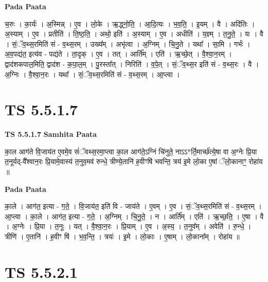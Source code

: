 \documentclass[17pt]{extarticle}
\begin{document}
\textbf{Pada Paata} \newline

च॒रुः । का॒र्यः॑ । अ॒स्मिन्न् । ए॒व । लो॒के । ऋ॒द्ध्नो॒ति॒ । आ॒दि॒त्यः । भ॒व॒ति॒ । इ॒यम् । वै । अदि॑तिः । अ॒स्याम् । ए॒व । प्रतीति॑ । ति॒ष्ठ॒ति॒ । अथो॒ इति॑ । अ॒स्याम् । ए॒व । अधीति॑ । य॒ज्ञ्म् । त॒नु॒ते॒ । यः । वै । सं॒ॅव॒थ्स॒रमिति॑ सं - व॒थ्स॒रम् । उख्य᳚म् । अभृ॑त्वा । अ॒ग्निम् । चि॒नु॒ते । यथा᳚ । सा॒मि । गर्भः॑ । अ॒व॒पद्य॑त॒ इत्य॑व - पद्य॑ते । ता॒दृक् । ए॒व । तत् । आर्ति᳚म् । एति॑ । ऋ॒च्छे॒त् । वै॒श्वा॒न॒रम् । द्वाद॑शकपाल॒मिति॒ द्वाद॑श - क॒पा॒ल॒म् । पु॒रस्ता᳚त् । निरिति॑ । व॒पे॒त् । सं॒ॅव॒थ्स॒र इति॑ सं - व॒थ्स॒रः । वै । अ॒ग्निः । वै॒श्वा॒न॒रः । यथा᳚ । सं॒ॅव॒थ्स॒रमिति॑ सं - व॒थ्स॒रम् । आ॒प्त्वा ।  \newline





\section{ TS 5.5.1.7 }

\textbf{TS 5.5.1.7 } \newline
\textbf{Samhita Paata} \newline

का॒ल आग॑ते वि॒जाय॑त ए॒वमे॒व सं॑ॅवथ्स॒रमा॒प्त्वा का॒ल आग॑ते॒ऽग्निं चि॑नुते॒ नाऽऽ*र्ति॒मार्च्छ॑त्ये॒षा वा अ॒ग्नेः प्रि॒या त॒नूर्यद्-वै᳚श्वान॒रः प्रि॒यामे॒वास्य॑ त॒नुव॒मव॑ रुन्धे॒ त्रीण्ये॒तानि॑ ह॒वीꣳषि॑ भवन्ति॒ त्रय॑ इ॒मे लो॒का ए॒षां ॅलो॒कानाꣳ॒॒ रोहा॑य ॥ \newline

\textbf{Pada Paata} \newline

का॒ले । आग॑त॒ इत्या - ग॒ते॒ । वि॒जाय॑त॒ इति॑ वि - जाय॑ते । ए॒वम् । ए॒व । सं॒ॅव॒थ्स॒रमिति॑ सं - व॒थ्स॒रम् । आ॒प्त्वा । का॒ले । आग॑त॒ इत्या - ग॒ते॒ । अ॒ग्निम् । चि॒नु॒ते॒ । न । आर्ति᳚म् । एति॑ । ऋ॒च्छ॒ति॒ । ए॒षा । वै । अ॒ग्नेः । प्रि॒या । त॒नूः । यत् । वै॒श्वा॒न॒रः । प्रि॒याम् । ए॒व । अ॒स्य॒ । त॒नुव᳚म् । अवेति॑ । रु॒न्धे॒ । त्रीणि॑ । ए॒तानि॑ । ह॒वीꣳ षि॑ । भ॒व॒न्ति॒ । त्रयः॑ । इ॒मे । लो॒काः । ए॒षाम् । लो॒काना᳚म् । रोहा॑य ॥  \newline





\section{ TS 5.5.2.1 }
\end{document}

